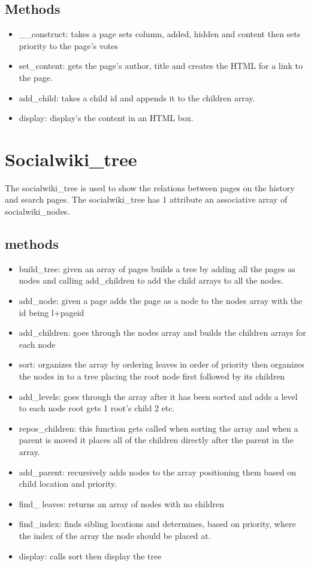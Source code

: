 \documentclass[letterpaper,twoside,11pt]{article}
\begin{document}
\subsection{Methods}
	\begin{itemize}
		\item \_\_construct: takes a page sets column, added, hidden and content then sets priority to the page's votes
		\item set\_content: gets the page's author, title and creates the HTML for a link to the page.
		\item add\_child: takes a child id and appends it to the children array.
		\item display: display's the content in an HTML box.
	\end{itemize}

\section{Socialwiki\_tree}
The socialwiki\_tree is used to show the relations between pages on the history and search pages.
The socialwiki\_tree has 1 attribute an associative array of socialwiki\_nodes.
	\subsection{methods}
		\begin{itemize}
			\item build\_tree: given an array of pages builds a tree by adding all the pages as nodes and calling add\_children to add the child arrays to all the nodes.
			\item add\_node: given a page adds the page as a node to the nodes array with the id being l+pageid
			\item add\_children: goes through the nodes array and builds the children arrays for each node
			\item sort: organizes the array by ordering leaves in order of priority then organizes the nodes in to a tree placing the root node first followed by its children
			\item add\_levels: goes through the array after it has been sorted and adds a level to each node root gets 1 root's child 2 etc.
			\item repos\_children: this function gets called when sorting the array and when a parent is moved it places all of the children directly after the parent in the array.
			\item add\_parent: recursively adds nodes to the array positioning them based on child location and priority.
			\item find\_ leaves: returns an array of nodes with no children
			\item find\_index: finds sibling locations and determines, based on priority, where the index of the array the node should be placed at.
			\item display: calls sort then display the tree
		\end{itemize}
\end{document}
